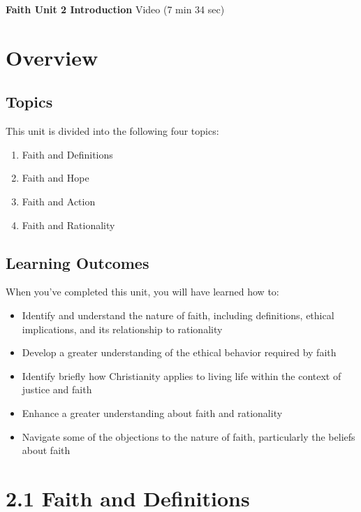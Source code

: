 \documentclass[
]{book}
\providecommand{\tightlist}{%
  \setlength{\itemsep}{0pt}\setlength{\parskip}{0pt}}
\begin{document}
\textbf{Faith Unit 2 Introduction} Video (7 min 34 sec)

\hypertarget{overview-1}{%
\section*{Overview}\label{overview-1}}

\hypertarget{topics-1}{%
\subsection*{Topics}\label{topics-1}}

This unit is divided into the following four topics:

\begin{enumerate}
\def\labelenumi{\arabic{enumi}.}
\tightlist
\item
  Faith and Definitions
\item
  Faith and Hope
\item
  Faith and Action
\item
  Faith and Rationality
\end{enumerate}

\hypertarget{learning-outcomes-1}{%
\subsection*{Learning Outcomes}\label{learning-outcomes-1}}

When you've completed this unit, you will have learned how to:

\begin{itemize}
\tightlist
\item
  Identify and understand the nature of faith, including definitions, ethical implications, and its relationship to rationality
\item
  Develop a greater understanding of the ethical behavior required by faith
\item
  Identify briefly how Christianity applies to living life within the context of justice and faith
\item
  Enhance a greater understanding about faith and rationality
\item
  Navigate some of the objections to the nature of faith, particularly the beliefs about faith
\end{itemize}

\hypertarget{faith-and-definitions}{%
\section*{2.1 Faith and Definitions}\label{faith-and-definitions}}
\end{document}
